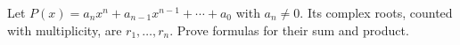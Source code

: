 Let $P(x)=a_nx^n+a_{n-1}x^{n-1}+\cdots+a_0$ with $a_n\ne0$. Its complex roots, counted with multiplicity, are $r_1,\ldots,r_n$. Prove formulas for their sum and product.
